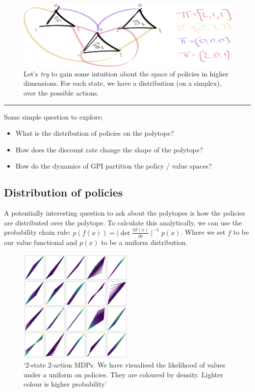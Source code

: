 \begin{figure}
\centering
\includegraphics[width=1\textwidth,height=0.25\textheight]{../../pictures/drawings/3-state-3-action-simplices.png}
\caption{Let's \textit{try} to gain some intuition about the space of policies in higher dimensions.
For each state, we have a distribution (on a simplex), over the possible actions.}
\end{figure}

\begin{center}\rule{0.5\linewidth}{\linethickness}\end{center}

Some simple question to explore;

\begin{itemize}
\tightlist
\item
  What is the distribution of policies on the polytope?
\item
  How does the discount rate change the shape of the polytope?
\item
  How do the dynamics of GPI partition the policy / value spaces?
\end{itemize}

\subsection{Distribution of policies}

A potentially interesting question to ask about the polytopes is how the
policies are distributed over the polytope. To calculate this
analytically, we can use the probability chain rule:
\(p(f(x)) = \mid \det\frac{\partial f(x)}{\partial x}\mid^{-1}p(x)\).
Where we set \(f\) to be our value functional and \(p(x)\) to be a
uniform distribution.

\begin{figure}
\centering
\includegraphics[width=0.5\textwidth,height=0.5\textheight]{../../pictures/figures/polytope_densities.png}
\caption{`2-state 2-action MDPs. We have visualised the likelihood of
values under a uniform on policies. They are coloured by density.
Lighter colour is higher probability'}
\end{figure}

